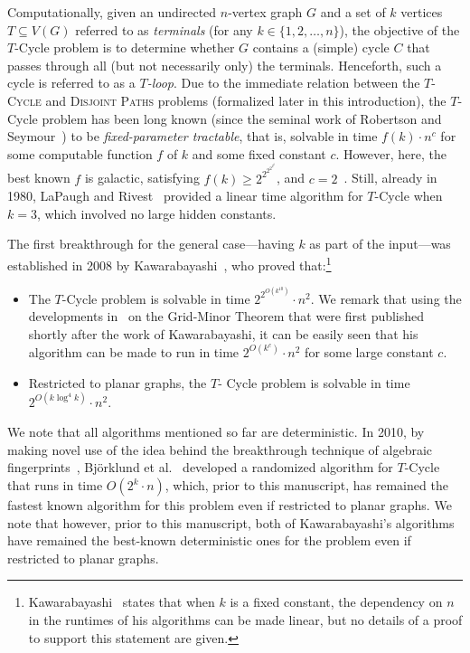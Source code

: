 \documentclass{article}
\numberwithin{claimcounter}{lemma}
\newcommand{\tcycle}{$T$-\textsc{Cycle}\xspace}
\newcommand{\dispaths}{\textsc{Disjoint Paths}\xspace}
\begin{document}
Computationally, given an undirected $n$-vertex graph $G$ and a set of  $k$ vertices $T\subseteq V(G)$ referred to as {\em terminals} (for any $k\in\{1,2,\ldots,n\}$), the objective of the {\sc $T$-Cycle} problem is to determine whether $G$ contains a (simple) cycle $C$ that passes through all (but not necessarily only) the terminals. 
Henceforth, such a cycle is referred to as a \emph{$T$-loop}.
Due to the immediate relation between the \tcycle and \dispaths problems (formalized later in this introduction), the {\sc $T$-Cycle} problem has been long known (since the seminal work of Robertson and Seymour~\cite{DBLP:journals/jct/RobertsonS95b}) to be {\em fixed-parameter tractable}, that is, solvable in time $f(k)\cdot n^c$ for some computable function $f$ of $k$ and some fixed constant $c$. However, here, the best known $f$ is galactic, satisfying $f(k)\geq 2^{2^{2^{2^{2^k}}}}$, and $c=2$~\cite{DBLP:journals/jct/KawarabayashiKR12}.  Still, already in 1980, LaPaugh and Rivest~\cite{DBLP:journals/jcss/LapaughR80} provided a linear time algorithm for {\sc $T$-Cycle} when $k = 3$, which involved no large hidden constants. 

The first breakthrough for the general case---having $k$ as part of the input---was established in 2008 by Kawarabayashi~\cite{kawarabayashi2008improved}, who proved that:\footnote{Kawarabayashi~\cite{kawarabayashi2008improved} states that when $k$ is  a fixed constant, the dependency on $n$ in the runtimes of his algorithms can be made  linear, but no details of a proof to support this statement are given.}
\begin{itemize}
\item The {\sc $T$-Cycle} problem is solvable in time $2^{2^{O(k^{10})}}\cdot n^2$. We remark that using the developments in~\cite{DBLP:journals/jacm/ChekuriC16} on the Grid-Minor Theorem that were first published shortly after the work of Kawarabayashi, it can be easily seen that his algorithm can be made to run in time $2^{O(k^c)}\cdot n^2$ for some large constant $c$.
\item Restricted to planar graphs, the {\sc $T$- Cycle} problem is solvable in time $2^{O(k\log^4 k)}\cdot n^2$.
\end{itemize}

We note that all algorithms mentioned so far are deterministic. 
In 2010, by making novel use of the idea behind the breakthrough technique of algebraic fingerprints~\cite{DBLP:journals/siamcomp/Bjorklund14,DBLP:journals/jcss/BjorklundHKK17}, Bj\"{o}rklund et al.~\cite{DBLP:conf/soda/BjorklundHT12} developed a randomized algorithm for {\sc $T$-Cycle} that runs in time $O(2^k\cdot n)$, which, prior to this manuscript, has remained the fastest known algorithm for this problem even if restricted to planar graphs. We note that 
however, prior to this manuscript, both of  Kawarabayashi's algorithms have remained the best-known deterministic ones for the problem even if restricted to planar graphs.
\end{document}
